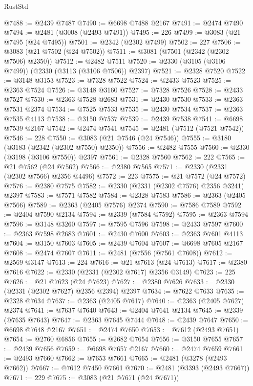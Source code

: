 \begin{lexlean}{RustStd}
\begin{coremodule}
@7488 := @2439 @7487
@7490 := @6698 @7488 @2167
@7491 := @2474 @7490
@7494 := @2481 (@3008 (@2493 @7491))
@7495 := 226
@7499 := @3083 (@21 @7495 (@24 @7495))
@7501 := @2342 (@2302 @7499)
@7502 := 227
@7506 := @3083 (@21 @7502 (@24 @7502))
@7511 := @3081 (@7501 (@2342 (@2302 @7506) @2350))
@7512 := @2482 @7511
@7520 := @2330 (@3105 (@3106 @7499)) (@2330 (@3113 (@3106 @7506)) @2397)
@7521 := @2328 @7520
@7522 := @3148 @3153
@7523 := @7328 @7522
@7524 := @2433 @7523
@7525 := @2363 @7524
@7526 := @3148 @3160
@7527 := @7328 @7526
@7528 := @2433 @7527
@7530 := @2363 @7528 @2683
@7531 := @2430 @7530
@7533 := @2363 @7531 @2374
@7534 := @7525 @7533
@7535 := @2430 @7534
@7537 := @2363 @7535 @4113
@7538 := @3150 @7537
@7539 := @2439 @7538
@7541 := @6698 @7539 @2167
@7542 := @2474 @7541
@7545 := @2481 (@7512 (@7521 @7542))
@7546 := 228
@7550 := @3083 (@21 @7546 (@24 @7546))
@7555 := @3180 (@3183 (@2342 (@2302 @7550) @2350))
@7556 := @2482 @7555
@7560 := @2330 (@3198 (@3106 @7550)) @2397
@7561 := @2328 @7560
@7562 := 222
@7565 := @21 @7562 (@24 @7562)
@7566 := @2380 @7565
@7571 := @2330 (@2331 (@2302 @7566) @2356 @4496)
@7572 := 223
@7575 := @21 @7572 (@24 @7572)
@7576 := @2380 @7575
@7582 := @2330 (@2331 (@2302 @7576) @2356 @3241) @2397
@7583 := @7571 @7582
@7584 := @2328 @7583
@7586 := @2363 (@2405 @7566)
@7589 := @2363 (@2405 @7576) @2374
@7590 := @7586 @7589
@7592 := @2404 @7590 @2134
@7594 := @2339 (@7584 @7592)
@7595 := @2363 @7594
@7596 := @3148 @3260
@7597 := @7595 @7596
@7598 := @2433 @7597
@7600 := @2363 @7598 @2683
@7601 := @2430 @7600
@7603 := @2363 @7601 @4113
@7604 := @3150 @7603
@7605 := @2439 @7604
@7607 := @6698 @7605 @2167
@7608 := @2474 @7607
@7611 := @2481 (@7556 (@7561 @7608))
@7612 := @2569 @3147
@7613 := 224
@7616 := @21 @7613 (@24 @7613)
@7617 := @2380 @7616
@7622 := @2330 (@2331 (@2302 @7617) @2356 @3149)
@7623 := 225
@7626 := @21 @7623 (@24 @7623)
@7627 := @2380 @7626
@7633 := @2330 (@2331 (@2302 @7627) @2356 @2394) @2397
@7634 := @7622 @7633
@7635 := @2328 @7634
@7637 := @2363 (@2405 @7617)
@7640 := @2363 (@2405 @7627) @2374
@7641 := @7637 @7640
@7643 := @2404 @7641 @2134
@7645 := @2339 (@7635 @7643)
@7647 := @2363 @7645 @7444
@7648 := @2439 @7647
@7650 := @6698 @7648 @2167
@7651 := @2474 @7650
@7653 := @7612 (@2493 @7651)
@7654 := @2760 @6856
@7655 := @2682 @7654
@7656 := @3150 @7655
@7657 := @2439 @7656
@7659 := @6698 @7657 @2167
@7660 := @2474 @7659
@7661 := @2493 @7660
@7662 := @7653 @7661
@7665 := @2481 (@3278 (@2493 @7662))
@7667 := @7612 @7450 @7661
@7670 := @2481 (@3393 (@2493 @7667))
@7671 := 229
@7675 := @3083 (@21 @7671 (@24 @7671))

\end{coremodule}
\end{lexlean}
